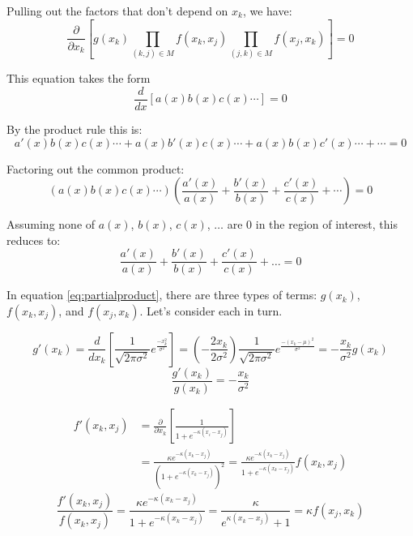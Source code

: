 \documentclass{article}
\begin{document}
Pulling out the factors that don't depend on $x_k$, we have:
\begin{equation} \label{eq:partialproduct}
  \frac{\partial}{\partial x_k} \left[ g(x_k)
      \prod_{(k, j) \in M} f(x_k, x_j)
    \prod_{(j, k) \in M} f(x_j, x_k) \right]
      = 0
\end{equation}

This equation takes the form
\begin{equation*}
  \frac{d}{dx}[a(x) b(x) c(x) \cdots] = 0
\end{equation*}

By the product rule this is:
\begin{equation*}
    a'(x) b(x) c(x) \cdots
  + a(x) b'(x) c(x) \cdots
  + a(x) b(x) c'(x) \cdots + \cdots = 0
\end{equation*}

Factoring out the common product:
\begin{equation*}
  (a(x) b(x) c(x) \cdots) (
      \frac{a'(x)}{a(x)}
    + \frac{b'(x)}{b(x)}
    + \frac{c'(x)}{c(x)}
    + \cdots) = 0
\end{equation*}

Assuming none of $a(x)$, $b(x)$, $c(x)$, $\ldots$ are 0 in the region of
interest, this reduces to:
\begin{equation*}
      \frac{a'(x)}{a(x)}
    + \frac{b'(x)}{b(x)}
    + \frac{c'(x)}{c(x)}
    + \ldots = 0
\end{equation*}

In equation \ref{eq:partialproduct}, there are three types of terms: $g(x_k)$, 
$f(x_k, x_j)$, and $f(x_j, x_k)$. Let's consider each in turn.

\begin{equation*}
  g'(x_k) = \frac{d}{d x_k} \left[ \frac{1}{\sqrt{2\pi\sigma^2}} e^{\frac{-x_k^2}{\sigma^2}} \right]
  = (-\frac{2 x_k}{2 \sigma^2}) \frac{1}{\sqrt{2\pi\sigma^2}} e^{\frac{-(x_k - \mu)^2}{\sigma^2}}
    = -\frac{x_k}{\sigma^2} g(x_k)
  \end{equation*}
\begin{equation*}
  \frac{g'(x_k)}{g(x_k)} = -\frac{x_k}{\sigma^2}
\end{equation*}

\begin{align*}
  f'(x_k, x_j) &= \frac{\partial}{\partial x_k} \left[\frac{1}{1 + e^{-\kappa(x_i - x_j)}}\right] \\
               &= \frac{\kappa e^{-\kappa(x_k - x_j)}}{(1 + e^{-\kappa(x_k - x_j)})^2}
  = \frac{\kappa e^{-\kappa(x_k - x_j)}}{1 + e^{-\kappa(x_k - x_j)}} f(x_k, x_j)
\end{align*}
\begin{equation*}
  \frac{f'(x_k, x_j)}{f(x_k, x_j)}
  = \frac{\kappa e^{-\kappa(x_k - x_j)}}{1 + e^{-\kappa(x_k - x_j)}}
  = \frac{\kappa}{e^{\kappa(x_k - x_j)} + 1} = \kappa f(x_j, x_k)
\end{equation*}
\end{document}
